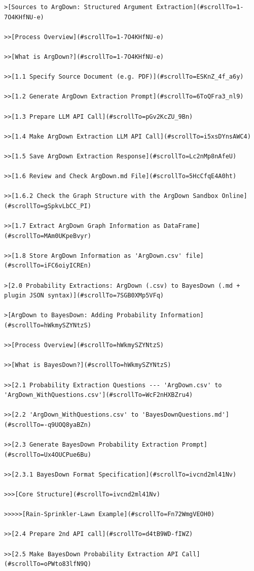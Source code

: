 \documentclass[
  11pt,
  letterpaper,
]{book}
\begin{document}
\begin{verbatim}
>[Sources to ArgDown: Structured Argument Extraction](#scrollTo=1-7O4KHfNU-e)

>>[Process Overview](#scrollTo=1-7O4KHfNU-e)

>>[What is ArgDown?](#scrollTo=1-7O4KHfNU-e)

>>[1.1 Specify Source Document (e.g. PDF)](#scrollTo=ESKnZ_4f_a6y)

>>[1.2 Generate ArgDown Extraction Prompt](#scrollTo=6ToQFra3_nl9)

>>[1.3 Prepare LLM API Call](#scrollTo=pGv2KcZU_9Bn)

>>[1.4 Make ArgDown Extraction LLM API Call](#scrollTo=i5xsDYnsAWC4)

>>[1.5 Save ArgDown Extraction Response](#scrollTo=Lc2nMp8nAfeU)

>>[1.6 Review and Check ArgDown.md File](#scrollTo=5HcCfqE4A0ht)

>>[1.6.2 Check the Graph Structure with the ArgDown Sandbox Online](#scrollTo=gSpkvLbCC_PI)

>>[1.7 Extract ArgDown Graph Information as DataFrame](#scrollTo=MAm0UKpeBvyr)

>>[1.8 Store ArgDown Information as 'ArgDown.csv' file](#scrollTo=iFC6oiyICREn)

>[2.0 Probability Extractions: ArgDown (.csv) to BayesDown (.md + plugin JSON syntax)](#scrollTo=7SGB0XMp5VFq)

>[ArgDown to BayesDown: Adding Probability Information](#scrollTo=hWkmySZYNtzS)

>>[Process Overview](#scrollTo=hWkmySZYNtzS)

>>[What is BayesDown?](#scrollTo=hWkmySZYNtzS)

>>[2.1 Probability Extraction Questions --- 'ArgDown.csv' to 'ArgDown_WithQuestions.csv'](#scrollTo=WcF2nHXBZru4)

>>[2.2 'ArgDown_WithQuestions.csv' to 'BayesDownQuestions.md'](#scrollTo=-q9UOQ8yaBZn)

>>[2.3 Generate BayesDown Probability Extraction Prompt](#scrollTo=Ux4OUCPue6Bu)

>>[2.3.1 BayesDown Format Specification](#scrollTo=ivcnd2ml41Nv)

>>>[Core Structure](#scrollTo=ivcnd2ml41Nv)

>>>>>[Rain-Sprinkler-Lawn Example](#scrollTo=Fn72WmgVEOH0)

>>[2.4 Prepare 2nd API call](#scrollTo=d4tB9WD-fIWZ)

>>[2.5 Make BayesDown Probability Extraction API Call](#scrollTo=oPWto83lfN9Q)


\end{verbatim}
\end{document}
